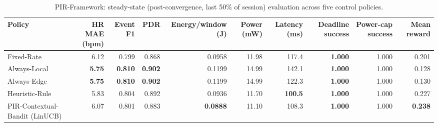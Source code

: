 \begin{table}[t]
\centering
\caption{PIR-Framework: steady-state (post-convergence, last 50\% of session) evaluation across five control policies.}
\label{tab:pir_overall}
\begin{tabular}{lrrrrrrrrr}
\toprule
Policy & HR MAE (bpm) & Event F1 & PDR & Energy/window (J) & Power (mW) & Latency (ms) & Deadline success & Power-cap success & Mean reward \\
\midrule
Fixed-Rate & 6.12 & 0.799 & 0.868 & 0.0958 & 11.98 & 117.4 & \textbf{1.000} & 1.000 & 0.201 \\
Always-Local & \textbf{5.75} & \textbf{0.810} & \textbf{0.902} & 0.1199 & 14.99 & 142.1 & \textbf{1.000} & 1.000 & 0.128 \\
Always-Edge & \textbf{5.75} & \textbf{0.810} & \textbf{0.902} & 0.1199 & 14.99 & 122.3 & \textbf{1.000} & 1.000 & 0.130 \\
Heuristic-Rule & 5.83 & 0.804 & 0.892 & 0.0936 & 11.70 & \textbf{100.5} & \textbf{1.000} & 1.000 & 0.227 \\
PIR-Contextual-Bandit (LinUCB) & 6.07 & 0.801 & 0.883 & \textbf{0.0888} & 11.10 & 108.3 & \textbf{1.000} & 1.000 & \textbf{0.238} \\
\bottomrule
\end{tabular}
\end{table}